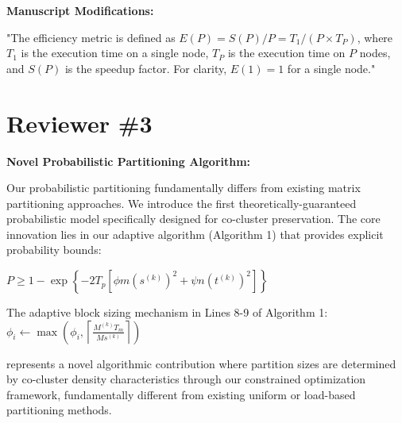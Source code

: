 \documentclass{ar2rc}
\begin{document}


\textbf{Manuscript Modifications:}

"The efficiency metric is defined as $E(P) = S(P)/P = T_1/(P \times T_P)$, where $T_1$ is the execution time on a single node, $T_P$ is the execution time on $P$ nodes, and $S(P)$ is the speedup factor. For clarity, $E(1) = 1$ for a single node."


\section{Reviewer \#3}



\textbf{Novel Probabilistic Partitioning Algorithm:}

Our probabilistic partitioning fundamentally differs from existing matrix partitioning approaches. We introduce the first theoretically-guaranteed probabilistic model specifically designed for co-cluster preservation. The core innovation lies in our adaptive algorithm (Algorithm 1) that provides explicit probability bounds:

$P \geq 1 - \exp\left\{-2T_p\left[\phi m (s^{(k)})^2 + \psi n (t^{(k)})^2\right]\right\}$

The adaptive block sizing mechanism in Lines 8-9 of Algorithm 1:
$\phi_i \leftarrow \max\left(\phi_i, \left\lceil\frac{M^{(k)}T_m}{Ms^{(k)}}\right\rceil\right)$

represents a novel algorithmic contribution where partition sizes are determined by co-cluster density characteristics through our constrained optimization framework, fundamentally different from existing uniform or load-based partitioning methods.
\end{document}
